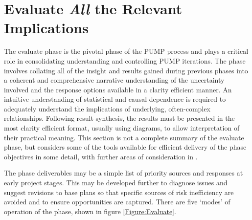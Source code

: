 \section{Evaluate \textit{All} the Relevant Implications} \label{s:Evaluate}



The evaluate phase is the pivotal phase of the PUMP process and plays a critical role in consolidating understanding and controlling PUMP iterations.
The phase involves collating all of the insight and results gained during previous phases into a coherent and comprehensive narrative understanding of the uncertainty involved and the response options available in a clarity efficient manner.
An intuitive understanding of statistical and causal dependence is required to adequately understand the implications of underlying, often-complex relationships.
Following result synthesis, the results must be presented in the most clarity efficient format, usually using diagrams, to allow interpretation of their practical meaning.
This section is not a complete summary of the evaluate phase, but considers some of the tools available for efficient delivery of the phase objectives in some detail, with further areas of consideration in \cite{chapman}.

The phase deliverables may be a simple list of priority sources and responses at early project stages.
This may be developed further to diagnose issues and suggest revisions to base plans so that specific sources of risk inefficiency are avoided and to ensure opportunities are captured.
There are five `modes' of operation of the phase, shown in figure \ref{Figure:Evaluate}.

